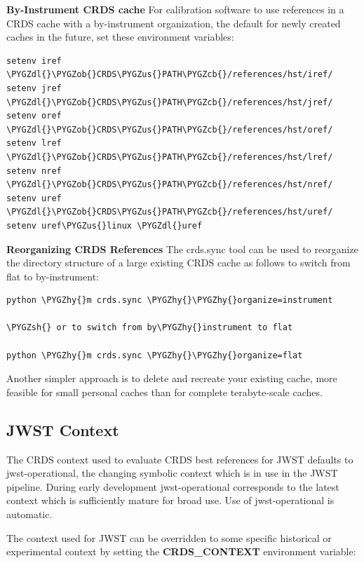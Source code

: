 \documentclass[letterpaper,10pt,english]{sphinxmanual}
\def\PYGZus{\char`\_}
\def\PYGZob{\char`\{}
\def\PYGZcb{\char`\}}
\def\PYGZsh{\char`\#}
\def\PYGZdl{\char`\$}
\def\PYGZhy{\char`\-}
\begin{document}
\textbf{By-Instrument CRDS cache} For calibration software to use references in a CRDS cache with a by-instrument
organization, the default for newly created caches in the future, set these environment variables:

\begin{Verbatim}[commandchars=\\\{\}]
setenv iref \PYGZdl{}\PYGZob{}CRDS\PYGZus{}PATH\PYGZcb{}/references/hst/iref/
setenv jref \PYGZdl{}\PYGZob{}CRDS\PYGZus{}PATH\PYGZcb{}/references/hst/jref/
setenv oref \PYGZdl{}\PYGZob{}CRDS\PYGZus{}PATH\PYGZcb{}/references/hst/oref/
setenv lref \PYGZdl{}\PYGZob{}CRDS\PYGZus{}PATH\PYGZcb{}/references/hst/lref/
setenv nref \PYGZdl{}\PYGZob{}CRDS\PYGZus{}PATH\PYGZcb{}/references/hst/nref/
setenv uref \PYGZdl{}\PYGZob{}CRDS\PYGZus{}PATH\PYGZcb{}/references/hst/uref/
setenv uref\PYGZus{}linux \PYGZdl{}uref
\end{Verbatim}

\textbf{Reorganizing CRDS References} The crds.sync tool can be used to reorganize the directory structure of a large
existing CRDS cache as follows to switch from flat to by-instrument:

\begin{Verbatim}[commandchars=\\\{\}]
python \PYGZhy{}m crds.sync \PYGZhy{}\PYGZhy{}organize=instrument

\PYGZsh{} or to switch from by\PYGZhy{}instrument to flat

python \PYGZhy{}m crds.sync \PYGZhy{}\PYGZhy{}organize=flat
\end{Verbatim}

Another simpler approach is to delete and recreate your existing cache, more feasible for small personal caches
than for complete terabyte-scale caches.


\subsection{JWST Context}
\label{installation:jwst-context}
The CRDS context used to evaluate CRDS best references for JWST defaults to jwst-operational,  the changing
symbolic context which is in use in the JWST pipeline.  During early development jwst-operational corresponds
to the latest context which is sufficiently mature for broad use.  Use of jwst-operational is automatic.

The context used for JWST can be overridden to some specific historical or experimental context by setting
the \textbf{CRDS\_CONTEXT} environment variable:
\end{document}
